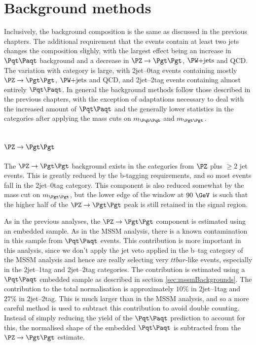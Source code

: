 \section{Background methods}
\label{sec:Hhhbackgrounds}

Inclusively, the background composition is the same as discussed in the previous
chapters. The additional requirement that the events contain at least two jets
changes the composition slighly, with the largest effect being an increase in
$\ttbar$ background and a decrease in $\ZToTauTau$, $\WJets$ and QCD. The
variation with category is large, with 2jet--0tag events containing mostly
$\ZToTauTau$, $\WJets$ and QCD, and 2jet--2tag events containing almost entirely
$\ttbar$. In general the background methods follow those described in the
previous chapters, with the exception of adaptations necessary to deal with the
increased amount of $\ttbar$ and the generally lower statistics in the
categories after applying the mass cuts on $m_{\Pqb\Pqb}$ and $m_{\Pgt\Pgt}$.

\subsection{$\ZToTauTau$}

The $\ZToTauTau$ background exists in the categories from $\PZ$ plus $\geq 2$
jet events. This is greatly reduced by the b-tagging requirements, and so most
events fall in the 2jet--0tag category. This component is also reduced somewhat
by the mass cut on $m_{\Pgt\Pgt}$, but the lower edge of the window at $90~\GeV$
is such that the higher half of the $\ZToTauTau$ peak is still retained in the
signal region.  

As in the previous analyses, the $\ZToTauTau$ component is estimated using an
embedded sample. As in the \ac{MSSM} analysis, there is a known contamination in
this sample from $\ttbar$ events. This contribution is more important in this
analysis, since we don't apply the jet veto applied in the b--tag category of
the \ac{MSSM} analysis and hence are really selecting very $ttbar$-like events,
especially in the 2jet--1tag and 2jet--2tag categories. The contribution is
estimated using a $\ttbar$ embedded sample as described in section
\ref{sec:mssmBackgrounds}. The contribution to the total normalisation is
approximately $10\%$ in 2jet--1tag and $27\%$ in 2jet--2tag. This is much larger
than in the \ac{MSSM} analysis, and so a more careful method is used to subtract
this contribution to avoid double counting. Instead of simply reducing the yield
of the $\ttbar$ prediction to account for this, the normalised shape of the
embedded $\ttbar$ is subtracted from the $\ZToTauTau$ estimate.

